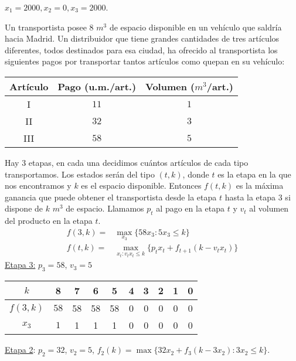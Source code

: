 \documentclass[twoside]{article}
\begin{document}
\begin{ejercicio}{1}
\begin{solucion}
\begin{center}
\vspace{0.5em}
\end{center}

$x_1=2000, x_2=0, x_3=2000$.
\end{solucion}
\end{ejercicio}

\newpage 
\begin{ejercicio}{2}
Un transportista posee $8$ $m^3$ de espacio disponible en un vehículo que saldría hacia Madrid.
Un distribuidor que tiene grandes cantidades de tres artículos diferentes, todos destinados para
esa ciudad, ha ofrecido al transportista los siguientes pagos por transportar tantos artículos como
quepan en su vehículo:
\begin{center}

\begin{tabular}{c| c| c}
Artículo & Pago (u.m./art.) & Volumen ($m^3$/art.)\\
\hline
I & $11$ & $1$\\
II& $32$& $3$\\
III& $58$ & $5$\\

\end{tabular}
\end{center}

\begin{solucion}
Hay $3$ etapas, en cada una decidimos cuántos artículos de cada tipo transportamos. Los estados serán del tipo $(t,k)$, donde $t$ es la etapa en la que nos encontramos y $k$ es el espacio disponible. Entonces $f(t,k)$ es la máxima ganancia que puede obtener el transportista desde la etapa $t$ hasta la etapa $3$ si dispone de $k$ $m^3$ de espacio. Llamamos $p_t$ al pago en la etapa $t$ y $v_t$ al volumen del producto en la etapa $t$. 
\begin{align*}
f(3,k)=&\max_{x_3}\{58x_3: 5x_3\leq k\}\\
f(t,k)=&\max_{x_t:v_tx_t\leq k}\{p_tx_t+f_{t+1}(k-v_tx_t)\}
\end{align*}
\underline{Etapa 3:} $p_3=58$, $v_3=5$\
\begin{center}
\begin{tabular}{c| c c c c c c c c c}
$k$ & 8 & 7 & 6 & 5 & 4 & 3 & 2 & 1 & 0\\
\hline
$f(3,k)$ & $58$ & 58 & 58 & 58 & 0 & 0 & 0 & 0 & 0\\
$x_3$ &  $1$ & 1 & 1 & 1& 0 & 0 & 0 & 0 & 0
\end{tabular}
\end{center}
\underline{Etapa 2}: $p_2=32$, $v_2=5$, $f_2(k)=\max\{32x_2+f_3(k-3x_2):3x_2\leq k\}$.


\end{solucion}
\end{ejercicio}
\end{document}
